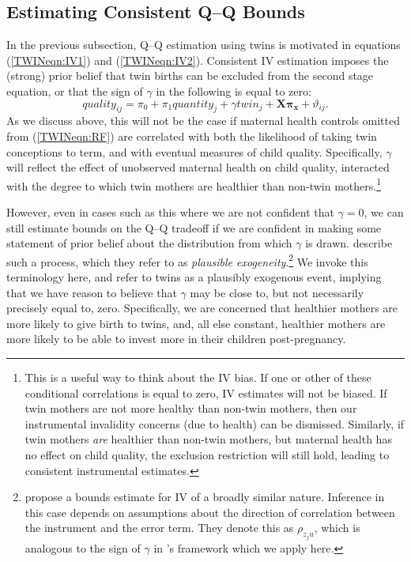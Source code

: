 \documentclass[subeqn]{article}
\begin{document}
\begin{spacing}{1.4}
\subsection{Estimating Consistent Q--Q Bounds}
\label{TWINscn:gamma}
In the previous subsection, Q--Q estimation using twins is motivated in equations
(\ref{TWINeqn:IV1}) and (\ref{TWINeqn:IV2}).  Consistent IV estimation imposes
the (strong) prior belief that twin births can be excluded from the second stage
equation, or that the sign of $\gamma$ in the following is equal to zero:
\begin{equation}
  \label{TWINeqn:Conley}
  quality_{ij}=\pi_0 + \pi_1 quantity_j + \gamma twin_j + \bm{X}\bm{\pi_x} + \vartheta_{ij}.
\end{equation}
As we discuss above, this will not be the case if maternal health controls
omitted from (\ref{TWINeqn:RF}) are correlated with both the likelihood of
taking twin conceptions to term, and with eventual measures of child quality.
Specifically, $\gamma$ will reflect the effect of unobserved maternal health
on child quality, interacted with the degree to which twin mothers are healthier
than non-twin mothers.\footnote{This is a useful way to think about the IV bias.
  If one or other of these conditional correlations is equal to zero, IV estimates
  will not be biased.  If twin mothers are not more healthy than non-twin mothers,
  then our instrumental invalidity concerns (due to health) can be dismissed.
  Similarly, if twin mothers \emph{are} healthier than non-twin mothers, but
  maternal health has no effect on child quality, the exclusion restriction will
  still hold, leading to consistent instrumental estimates.}

However, even in cases such as this where we are not confident that $\gamma=0$,
we can still estimate bounds on the Q--Q tradeoff if we are confident in making
some statement of prior belief about the distribution from which $\gamma$ is
drawn.  \citet{Conleyetal2012} describe such a process, which they refer to as
\emph{plausible exogeneity}.\footnote{\citet{NevoRosen2012} propose a bounds
  estimate for IV of a broadly similar nature.  Inference in this case depends on
  assumptions about the direction of correlation between the instrument and the
  error term. They denote this as $\rho_{z_{j}u}$, which is analogous to the sign
  of $\gamma$ in \citeauthor{Conleyetal2012}'s framework which we apply here.} We
invoke this terminology here, and refer to twins as a plausibly exogenous event,
implying that we have reason to believe that $\gamma$ may be close to, but not
necessarily precisely equal to, zero. Specifically, we are concerned that
healthier mothers are more likely to give birth to twins, and, all else
constant, healthier mothers are more likely to be able to invest more in their
children post-pregnancy.


\end{spacing}
\end{document}
